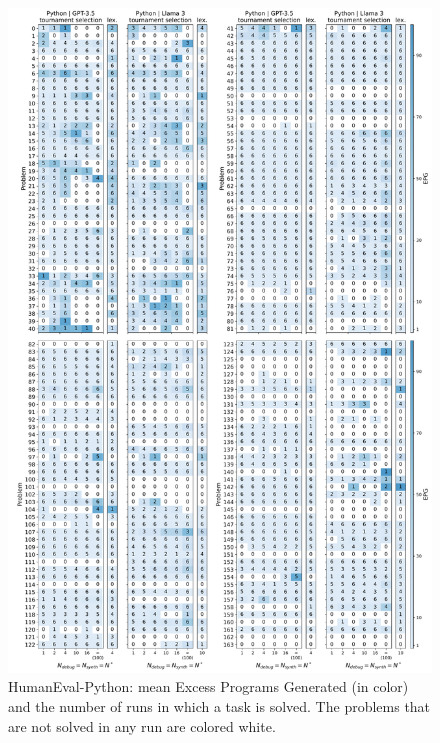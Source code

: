 \begin{figure}[hbt!]
  \centering
  \includegraphics[width=.88\linewidth, trim={0mm 3mm 0mm 2.6mm}, clip]{images/epg_mean_and_num_runs_problem_solved_avg_score_check_w_lexicase_humaneval_Python_6runs_heatmap_v5.pdf}
  \vspace{-4pt}
  \caption{HumanEval-Python: mean Excess Programs Generated (in color) and the number of runs in which a task is solved. The problems that are not solved in any run are colored white.}
  \label{fig:epg-num-solved-he-python}
  \vspace{-12pt}
\end{figure}

